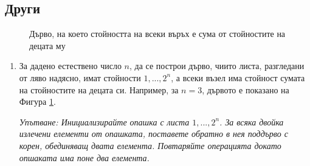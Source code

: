 \subsection{Други}


\begin{figure}[h]
	\centering
{}
	\caption{Дърво, на което стойността на всеки въръх е сума от стойностите на децата му}
	\label{fig:bottomup}
\end{figure}

\begin{enumerate}[resume]
	\item За дадено естествено число $n$, да се построи дърво, чиито листа, разгледани от ляво надясно, имат стойности $1,...,2^n$, а всеки възел има стойност сумата на стойностите на децата си. Например, за $n=3$, дървото е показано на Фигура \ref{fig:bottomup}.

	\emph{Упътване: Инициализирайте опашка с листа $1,...,2^n$. За всяка двойка излечени елементи от опашката, поставете обратно в нея поддърво с корен, обединяващ двата елемента. Повтаряйте операцията докато опшаката има поне два елемента.}
\end{enumerate}



